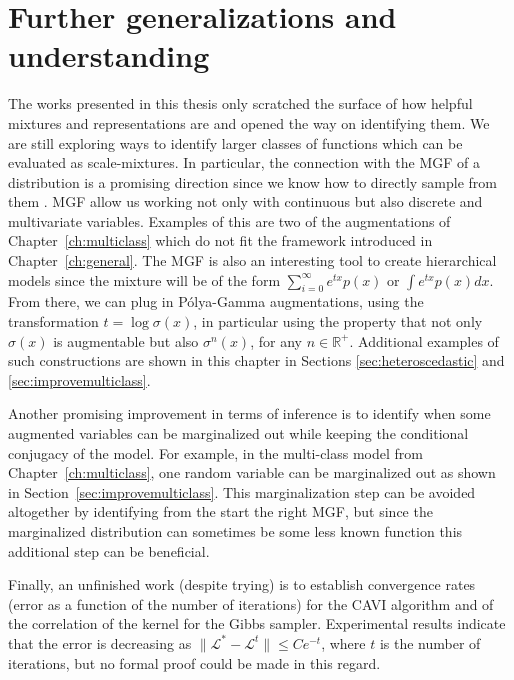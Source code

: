 

\graphicspath{{8/figures/}}


\section{Further generalizations and understanding}
The works presented in this thesis only scratched the surface of how helpful mixtures and representations are and opened the way on identifying them.
We are still exploring ways to identify larger classes of functions which can be evaluated as scale-mixtures.
In particular, the connection with the \acf{MGF} of a distribution is a promising direction since we know how to directly sample from them \cite{ridout2009generating}.
\ac{MGF} allow us working not only with continuous but also discrete and multivariate variables.
Examples of this are two of the augmentations of Chapter~\ref{ch:multiclass} which do not fit the framework introduced in Chapter~\ref{ch:general}.
The \ac{MGF} is also an interesting tool to create hierarchical models since the mixture will be of the form $\sum_{i=0}^\infty e^{tx} p(x)$ or $\int e^{tx}p(x)dx$.
From there, we can plug in P\'olya-Gamma augmentations, using the transformation $t=\log \sigma(x)$, in particular using the property that not only $\sigma(x)$ is augmentable but also $\sigma^n(x)$, for any $n\in \mathbb{R}^+$.
Additional examples of such constructions are shown in this chapter in Sections \ref{sec:heteroscedastic} and \ref{sec:improvemulticlass}.

Another promising improvement in terms of inference is to identify when some augmented variables can be marginalized out while keeping the conditional conjugacy of the model.
For example, in the multi-class model from Chapter~\ref{ch:multiclass}, one random variable can be marginalized out as shown in Section~\ref{sec:improvemulticlass}.
This marginalization step can be avoided altogether by identifying from the start the right \ac{MGF}, but since the marginalized distribution can sometimes be some less known function this additional step can be beneficial. 

Finally, an unfinished work (despite trying) is to establish convergence rates (error as a function of the number of iterations) for the \ac{CAVI} algorithm and of the correlation of the kernel for the Gibbs sampler.
Experimental results indicate that the error is decreasing as $\|\mathcal{L}^{*} - \mathcal{L}^{t}\|\leq C e^{-t}$, where $t$ is the number of iterations, but no formal proof could be made in this regard.

